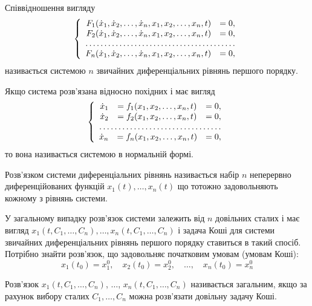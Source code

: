 Співвідношення вигляду
\begin{equation*}
	\left\{
		\begin{array}{rl}
			F_1(\dot x_1, \dot x_2, \ldots, \dot x_n, x_1, x_2, \ldots, x_n, t) &= 0, \\
			F_2(\dot x_1, \dot x_2, \ldots, \dot x_n, x_1, x_2, \ldots, x_n, t) &= 0, \\
			\hdotsfor{2} \\
			F_n(\dot x_1, \dot x_2, \ldots, \dot x_n, x_1, x_2, \ldots, x_n, t) &= 0,
		\end{array}
	\right.
\end{equation*}
називається системою $n$ звичайних диференціальних рівнянь першого порядку. \parvskip

Якщо система розв'язана відносно похідних і має вигляд
\begin{equation*}
	\left\{
		\begin{array}{rcl}
			\dot x_1 &= f_1(x_1, x_2, \ldots, x_n, t) &= 0, \\
			\dot x_2 &= f_2(x_1, x_2, \ldots, x_n, t) &= 0, \\
			\hdotsfor{3} \\
			\dot x_n &= f_n(x_1, x_2, \ldots, x_n, t) &= 0,
		\end{array}
	\right.
\end{equation*}
то вона називається системою в нормальній формі.

\begin{definition}
	Розв'язком системи диференціальних рівнянь на\-зи\-ва\-є\-ть\-ся набір $n$ неперервно диференційованих функцій $x_1(t), \ldots, x_n(t)$ що тотожно задовольняють кожному з рівнянь системи.
\end{definition}

У загальному випадку розв'язок системи залежить від $n$ довільних сталих і має вигляд  $x_1(t, C_1, \ldots, C_n), \ldots, x_n(t, C_1, \ldots, C_n)$ і задача Коші для системи звичайних диференціальних рівнянь першого порядку ставиться в такий спосіб. Потрібно знайти розв'язок, що задовольняє початковим умовам (умовам Коші):
\begin{equation*}
	x_1(t_0) = x_1^0, \quad x_2(t_0) = x_2^0, \quad \ldots, \quad x_n(t_0) = x_n^0
\end{equation*}

\begin{definition}
	Розв'язок $x_1(t, C_1, \ldots, C_n)$, $\ldots$, $x_n(t, C_1, \ldots, C_n)$ на\-зи\-ва\-є\-ть\-ся загальним, якщо за рахунок вибору сталих $C_1, \ldots, C_n$ можна роз\-в'яз\-а\-ти довільну задачу Коші.
\end{definition}

